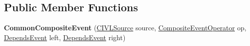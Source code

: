 \subsection*{Public Member Functions}
\begin{DoxyCompactItemize}
\item 
\hypertarget{classedu_1_1udel_1_1cis_1_1vsl_1_1civl_1_1model_1_1common_1_1contract_1_1CommonCompositeEvent_aeb55e24bea41e28752a9032b06609007}{}{\bfseries Common\+Composite\+Event} (\hyperlink{interfaceedu_1_1udel_1_1cis_1_1vsl_1_1civl_1_1model_1_1IF_1_1CIVLSource}{C\+I\+V\+L\+Source} source, \hyperlink{enumedu_1_1udel_1_1cis_1_1vsl_1_1civl_1_1model_1_1IF_1_1contract_1_1CompositeEvent_1_1CompositeEventOperator}{Composite\+Event\+Operator} op, \hyperlink{interfaceedu_1_1udel_1_1cis_1_1vsl_1_1civl_1_1model_1_1IF_1_1contract_1_1DependsEvent}{Depends\+Event} left, \hyperlink{interfaceedu_1_1udel_1_1cis_1_1vsl_1_1civl_1_1model_1_1IF_1_1contract_1_1DependsEvent}{Depends\+Event} right)\label{classedu_1_1udel_1_1cis_1_1vsl_1_1civl_1_1model_1_1common_1_1contract_1_1CommonCompositeEvent_aeb55e24bea41e28752a9032b06609007}


\end{DoxyCompactItemize}
